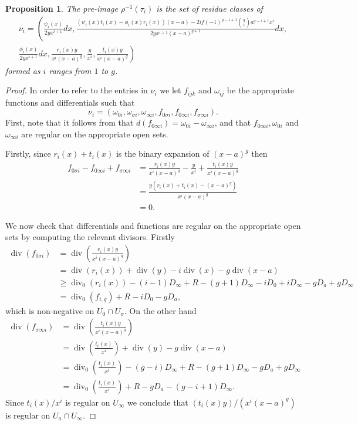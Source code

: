\documentclass[draft, 11pt]{article} %
\theoremstyle{plain}
\newtheorem{prop}[defn]{Proposition}
\theoremstyle{remark}
\DeclareMathOperator{\di}{div}
\begin{document}
\begin{prop}\label{basis22}
The pre-image $\rho^{-1}(\tau_i)$ is the set of residue classes of
\begin{multline*}
\nu_i = \left(\frac{\psi_i(x)}{2yx^{i+1}}dx, \frac{(\psi_i(x)t_i(x) - \phi_i(x)r_i(x))(x-a) - 2if(-1)^{g-i+1}\binom{g}{i} a^{g-i+1}x^i}{2yx^{i+1}(x-a)^{g+1}}dx,\right. \\\left. \frac{\phi_i(x)}{2yx^{i+1}}dx,  \frac{r_i(x)y}{x^i(x-a)^g}, \frac{y}{x^i},  \frac{t_i(x)y}{x^i(x-a)^g} \right)
\end{multline*}
formed as $i$ ranges from $1$ to $g$.
\end{prop}
\begin{proof}
In order to refer to the entries in $\nu_i$ we let $f_{ijk}$ and $\omega_{ij}$ be the appropriate functions and differentials such that
\[
\nu_i = \left( \omega_{0 i}, \omega_{\sigma i}, \omega_{\infty i}, f_{0 \sigma i}, f_{0 \infty i}, f_{\sigma \infty i} \right).
\]
First, note that it follows from \cite{derhamactions} that $d(f_{0 \infty i}) = \omega_{0 i} - \omega_{\infty i}$, and that $f_{0 \infty i}, \omega_{0 i}$ and $\omega_{\infty i}$ are regular on the appropriate open sets.

Firstly, since $r_i(x)+t_i(x)$ is the binary expansion of $(x-a)^g$ then
\begin{align*}
f_{0 \sigma i} - f_{0 \infty i}+ f_{\sigma \infty i} & = \frac{r_i(x)y}{x^i(x-a)^g} - \frac{y}{x^i} + \frac{t_i(x)y}{x^i(x-a)^g} \\
& = \frac{y(r_i(x) + t_i(x) - (x-a)^g)}{x^i(x-a)^g} \\
& = 0.
\end{align*}



We now check that differentials and functions are regular on the appropriate open sets by computing the relevant divisors.
Firstly
\begin{align*}
\di \left( f_{0 \sigma i} \right) & = \di \left( \frac{r_i(x)y}{x^i(x-a)^g} \right) \\
&  = \di(r_i(x)) + \di(y) - i\di(x) - g\di(x-a) \\
& \geq \di_0(r_i(x)) - (i-1)D_\infty +R - (g+1)D_\infty - iD_0 + iD_\infty - gD_a + gD_\infty \\
& = \di_0(f_{i,g}) +R -iD_0 - gD_a,
\end{align*}
which is non-negative on $U_0 \cap U_\sigma$.
On the other hand
\begin{align*}
\di \left( f_{\sigma \infty i} \right) & = \di \left( \frac{t_i(x)y}{x^i(x-a)^g} \right) \\
& = \di\left(\frac{t_i(x)}{x^i}\right) + \di(y) - g\di(x-a) \\
& = \di_0 \left( \frac{t_i(x)}{x^i} \right) - (g-i)D_\infty +R - (g+1)D_\infty - gD_a + gD_\infty\\
& = \di_0 \left( \frac{t_i(x)}{x^i} \right) +R - gD_a -(g-i+1)D_\infty.
\end{align*}
Since $t_i(x)/x^i$ is regular on $U_\infty$ we conclude that $({t_i(x)y})/({x^i(x-a)^g})$ is regular on $U_a \cap U_\infty$.


\end{proof}
\end{document}
